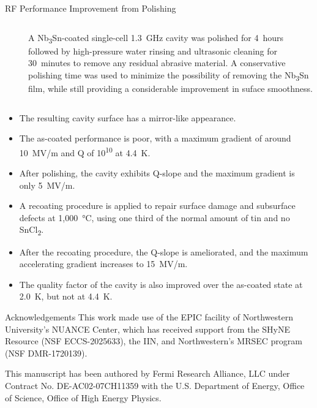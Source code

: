 \documentclass{beamer}
\begin{document}
\begin{frame}{}
\begin{columns}[t]
\begin{column}{0.32\textwidth}
\begin{block}{\label{sec:cavitycbp}RF Performance Improvement from Polishing}
\begin{columns}
\begin{column}{0.55\columnwidth}
\begin{figure}[t]
                            \end{figure}
                        \end{column}
                        \begin{column}{0.4\columnwidth}
                            A Nb\textsubscript{3}Sn-coated single-cell 1.3~GHz cavity was polished for 4~hours followed by high-pressure water rinsing and ultrasonic cleaning for 30~minutes to remove any residual abrasive material. A conservative polishing time was used to minimize the possibility of removing the Nb\textsubscript{3}Sn film, while still providing a considerable improvement in suface smoothness.
                        \end{column}
                    \end{columns}   
                    \begin{itemize}
                        \item The resulting cavity surface has a mirror-like appearance.
                        \item The as-coated performance is poor, with a maximum gradient of around 10~MV/m and Q of 10\textsuperscript{10} at 4.4~K.
                        \item After polishing, the cavity exhibits Q-slope and the maximum gradient is only 5~MV/m.
                        \item A recoating procedure is applied to repair surface damage and subsurface defects at 1,000~°C, using one third of the normal amount of tin and no SnCl\textsubscript{2}.
                        \item After the recoating procedure, the Q-slope is ameliorated, and the maximum accelerating gradient increases to 15~MV/m.
                        \item The quality factor of the cavity is also improved over the as-coated state at 2.0~K, but not at 4.4~K.
                    \end{itemize} 
                \end{block}

                \begin{block}{\label{sec:acknowledgements}Acknowledgements}
                    This work made use of the EPIC facility of Northwestern University’s NUANCE Center, which has received support from the SHyNE Resource (NSF ECCS-2025633), the IIN, and Northwestern's MRSEC program (NSF DMR-1720139).

                    This manuscript has been authored by Fermi Research Alliance, LLC under Contract No. DE-AC02-07CH11359 with the U.S. Department of Energy, Office of Science, Office of High Energy Physics.


\end{block}
\end{column}
\end{columns}
\end{frame}
\end{document}
